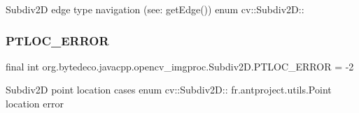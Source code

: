 Subdiv2D edge type navigation (see\+: get\+Edge()) enum cv\+::\+Subdiv2D\+:\+: \mbox{\label{group__imgproc_gaf2036f8d8ea03c954d0ab11577b69276}} 
\subsubsection{\texorpdfstring{P\+T\+L\+O\+C\+\_\+\+E\+R\+R\+OR}{PTLOC\_ERROR}}
{\footnotesize\ttfamily final int org.\+bytedeco.\+javacpp.\+opencv\+\_\+imgproc.\+Subdiv2\+D.\+P\+T\+L\+O\+C\+\_\+\+E\+R\+R\+OR = -\/2\hspace{0.3cm}{\ttfamily [static]}}

Subdiv2D point location cases enum cv\+::\+Subdiv2D\+:\+: fr.antproject.utils.Point location error